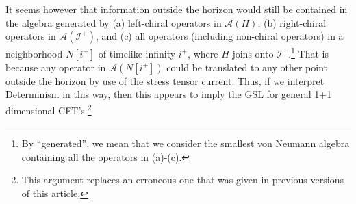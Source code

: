 \documentclass{article}
\begin{document}
It seems however that information outside the horizon would still be contained in the algebra generated by (a) left-chiral operators in $\mathcal{A}(H)$, (b) right-chiral operators in $\mathcal{A}(\mathcal{I}^+)$, and (c) all operators (including non-chiral operators) in a neighborhood $N[i^+]$ of timelike infinity $i^+$, where $H$ joins onto $\mathcal{I}^+$.\footnote{By ``generated'', we mean that we consider the smallest von Neumann algebra containing all the operators in (a)-(c).}  That is because any operator in $\mathcal{A}(N[i^+])$ could be translated to any other point outside the horizon by use of the stress tensor current.  Thus, if we interpret Determinism in this way, then this appears to imply the GSL for general 1+1 dimensional CFT's.\footnote{This argument replaces an erroneous one that was given in previous versions of this article.}


\end{document}
